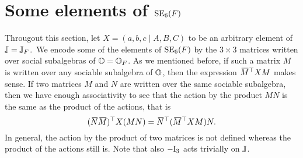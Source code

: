 \section{Some elements of $\mathrm{SE}_6(F)$}
\label{section:elts_E6}

Througout this section, let $X = (a,b,c\mid A,B,C)$ to be an arbitrary element of 
$\mathbb{J} = \mathbb{J}_F$.\ We encode some of the elements of $\mathrm{SE}_6(F)$ by the $3\times 3$
 matrices written over
social subalgebras of $\mathbb{O}=\mathbb{O}_{F}$. As we mentioned before, if such a matrix $M$ is written
over any sociable subalgebra of $\mathbb{O}$, then the expression $\mathord{\mbox{\hspace*{0pt}}\,\overline{\!M\!\!\;}\!\:}\mbox{\hspace*{0pt}}^{\top} X M$ makes sense.
If two matrices $M$ and $N$ are written over the same sociable subalgebra, then we have 
enough associativity to see that the action by the product $MN$ is the same as the product
of the actions, that is
\begin{equation}
	(\ovN \ovM)^{\T} X (MN) = \ovN^{\T} (\ovM^{\T} X M) N.
\end{equation} 
In general, the action by the product of two matrices is not defined whereas the product 
of the actions still is. Note that also $-\mathord{\mathrm{I}}_3$ acts trivially on $\mathbb{J}$. 

